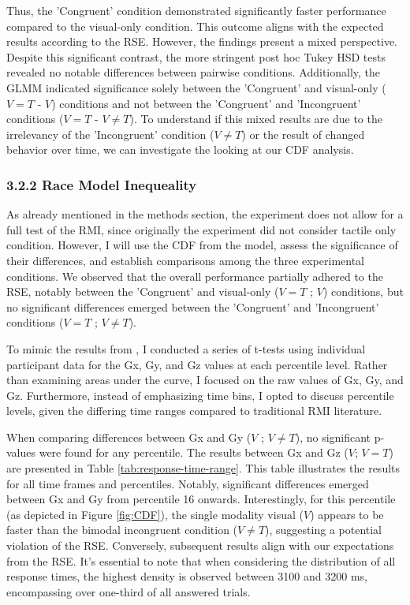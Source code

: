 \documentclass[12pt,oneside,openright]{report}
\begin{document}
Thus, the 'Congruent' condition demonstrated significantly faster performance compared to the visual-only condition. This outcome aligns with the expected results according to the RSE. However, the findings present a mixed perspective. Despite this significant contrast, the more stringent post hoc Tukey HSD tests revealed no notable differences between pairwise conditions. Additionally, the GLMM indicated significance solely between the 'Congruent' and visual-only ($V=T$ - $V$) conditions and not between the 'Congruent' and 'Incongruent' conditions ($V=T$ - $V \neq T$). To understand if this mixed results are due to the irrelevancy of the 'Incongruent' condition ($V \neq T$) or the result of changed behavior over time, we can investigate the looking at our CDF analysis.

\subsubsection*{3.2.2 Race Model Inequeality}

As already mentioned in the methods section, the experiment does not allow for a full test of the RMI, since originally the experiment did not consider tactile only condition. However, I will use the CDF from the model, assess the significance of their differences, and establish comparisons among the three experimental conditions. We observed that the overall performance partially adhered to the RSE, notably between the 'Congruent' and visual-only ($V=T$ ; $V$) conditions, but no significant differences emerged between the 'Congruent' and 'Incongruent' conditions ($V=T$ ; $V \neq T$). 

To mimic the results from \Cite{SALTAFOSSI2023108642}, I conducted a series of t-tests using individual participant data for the Gx, Gy, and Gz values at each percentile level. Rather than examining areas under the curve, I focused on the raw values of Gx, Gy, and Gz. Furthermore, instead of emphasizing time bins, I opted to discuss percentile levels, given the differing time ranges compared to traditional RMI literature. 

When comparing differences between Gx and Gy ($V$ ; $V \neq T$), no significant p-values were found for any percentile. The results between Gx and Gz ($V$; $V=T$) are presented in Table \ref{tab:response-time-range}. This table illustrates the results for all time frames and percentiles. Notably, significant differences emerged between Gx and Gy from percentile 16 onwards. Interestingly, for this percentile (as depicted in Figure \ref{fig:CDF}), the single modality visual ($V$) appears to be faster than the bimodal incongruent condition ($V \neq T$), suggesting a potential violation of the RSE. Conversely, subsequent results align with our expectations from the RSE. It's essential to note that when considering the distribution of all response times, the highest density is observed between 3100 and 3200 ms, encompassing over one-third of all answered trials.
 
\end{document}
